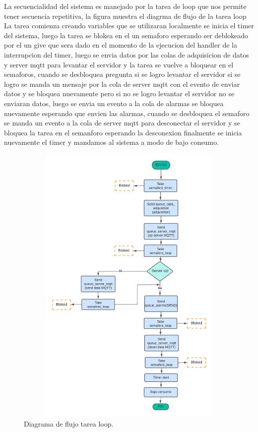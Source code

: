 La secuencialidad del sistema es manejado por la tarea de loop que nos permite tener secuencia repetitiva, la figura muestra el diagrma de flujo de la tarea loop 
La tarea comienza creando variables que se utilizaran localmente se inicia el timer del sistema, luego la tarea se blokea en el un semaforo esperando ser deblokeado por el un give que sera dado en el momento de la ejecucion del handler de la interrupcion del timer, luego se envia datos por las colas de adquisicion de datos y server mqtt para levantar el servidor y la tarea se vuelve a bloquear en el semaforos, cuando se desbloquea pregunta si se logro levantar el servidor si se logro se manda un mensaje por la cola de server mqtt con el evento de enviar datos y se bloquea nuevamente pero si no se logro levantar el servidor no se enviaran datos, luego se envia un evento a la cola de alarmas se bloquea nuevamente esperando que envien las alarmas, cuando se desbloquea el semaforo se manda un evento a la cola de server mqtt para desconectar el servidor y se bloquea la tarea en el semanforo esperando la desconexion  finalmente se inicia nuevamente el timer y mandamos al sistema a modo de bajo consumo. 
\begin{figure}[h]
  \centering
	\includegraphics[width=12cm, height=14cm]{./Figures/DF task loop.png}
	\caption{Diagrama de flujo tarea loop.}
	\label{fig:Df tarea loop sistema}
\end{figure}

